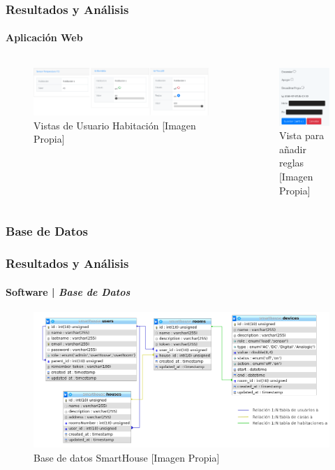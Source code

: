 \begin{frame}[t]
\frametitle{Resultados y Análisis}
\framesubtitle{Aplicación Web}
\begin{columns}
	\begin{figure}[!]
		\centering
		\caption{Vistas de Usuario Habitación [Imagen Propia]}
		\label{fig:userview}
		\includegraphics[width=\linewidth]{Imagenes/R_App}
	\end{figure}

	\begin{figure}[!]
		\centering
		\caption{Vista para añadir reglas [Imagen Propia]}
		\label{fig:rulesview}
		\includegraphics[width=0.5\linewidth]{Imagenes/rules_view}
	\end{figure}
\end{columns}
\end{frame}

\subsubsection{Base de Datos}
\begin{frame}
\frametitle{Resultados y Análisis}
\framesubtitle{Software | \emph{Base de Datos}}
\begin{figure}[H]
\centering
\caption{Base de datos SmartHouse [Imagen Propia]}
\label{fig:db}
\includegraphics[width=0.75\linewidth]{Imagenes/DB}
\end{figure}

\end{frame}


